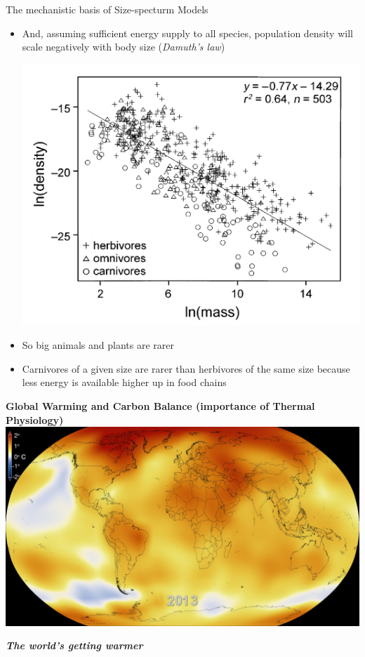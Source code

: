 \documentclass[xcolor={usenames,x11names},compress]{beamer}
\renewcommand{\(}{\begin{columns}}
\renewcommand{\)}{\end{columns}}
\newcommand{\<}[1]{\begin{column}{#1}}
\renewcommand{\>}{\end{column}}
\begin{document}
\begin{frame}{The mechanistic basis of Size-specturm Models}

  \begin{itemize}
    \item And, assuming sufficient energy supply to all species, population density will scale negatively with body size ({\it Damuth's law})

    \begin{center}
      \includegraphics[width=.5\textwidth]{Damuth.png} 
    \end{center}
 \vspace{-10pt}

  \item So big animals and plants are rarer 
   \item Carnivores of a given size are rarer than herbivores of the same size  because less energy is available higher up in food chains

  \end{itemize}

\end{frame}

\begin{frame}[plain]{}
  \centering

  {\Large \bf Global Warming and Carbon Balance (importance of Thermal Physiology)}\\
  \vspace{10pt}
  \includegraphics[width=.7\textwidth]{800.jpg}

  \vspace{4pt}

  {\small {\bf \it The world's getting warmer}}
\end{frame}
\end{document}
